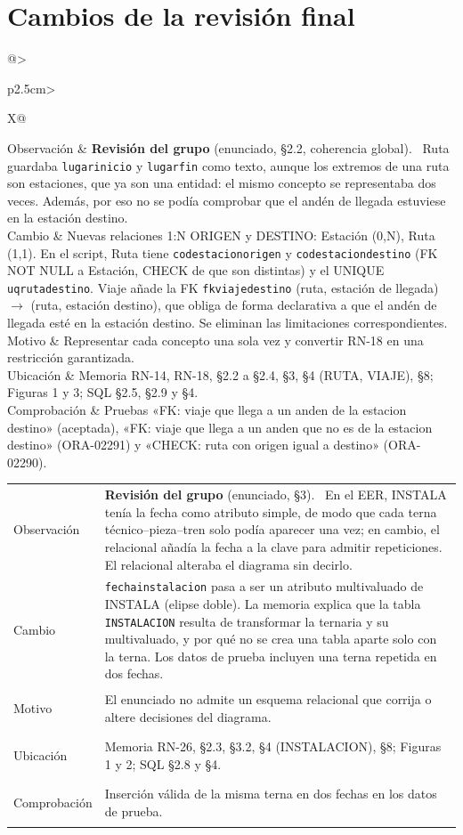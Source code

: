 \documentclass[11pt,a4paper]{article}
\makeatletter
\DeclareRobustCommand{\_}{\textunderscore\allowbreak}
\newcommand{\tb}[1]{\texttt{#1}}
\newcommand{\REV}[1]{\textbf{Revisión del grupo} (enunciado, #1).~}
\newcommand{\cambio}[7]{%
\begin{tcolorbox}[colback=white,colframe=azuluvigo,colbacktitle=azuluvigo!8,coltitle=azuluvigo,
  title={\textbf{#1}\quad #2},fonttitle=\normalsize,boxrule=0.6pt,arc=1mm,
  left=2mm,right=2mm,top=1mm,bottom=1mm,before skip=6pt,after skip=6pt]
\small
\begin{tabularx}{\linewidth}{@{}>{\bfseries\raggedright\arraybackslash}p{2.5cm}>{\raggedright\arraybackslash}X@{}}
Observación & #3\\
Cambio & #4\\
Motivo & #5\\
Ubicación & #6\\
Comprobación & #7\\
\end{tabularx}
\end{tcolorbox}}
\makeatother
\begin{document}
\section{Cambios de la revisión final}
\label{sec:final}
\cambio{F-01}{Origen y destino de la ruta como relaciones con Estación}
{\REV{§2.2, coherencia global} Ruta guardaba \tb{lugar\_inicio} y \tb{lugar\_fin} como texto, aunque los extremos de una ruta son estaciones, que ya son una entidad: el mismo concepto se representaba dos veces. Además, por eso no se podía comprobar que el andén de llegada estuviese en la estación destino.}
{Nuevas relaciones 1:N ORIGEN y DESTINO: Estación (0,N), Ruta (1,1). En el script, Ruta tiene \tb{cod\_estacion\_origen} y \tb{cod\_estacion\_destino} (FK NOT NULL a Estación, CHECK de que son distintas) y el UNIQUE \tb{uq\_ruta\_destino}. Viaje añade la FK \tb{fk\_viaje\_destino} (ruta, estación de llegada) $\rightarrow$ (ruta, estación destino), que obliga de forma declarativa a que el andén de llegada esté en la estación destino. Se eliminan las limitaciones correspondientes.}
{Representar cada concepto una sola vez y convertir RN-18 en una restricción garantizada.}
{Memoria RN-14, RN-18, §2.2 a §2.4, §3, §4 (RUTA, VIAJE), §8; Figuras 1 y 3; SQL §2.5, §2.9 y §4.}
{Pruebas «FK: viaje que llega a un anden de la estacion destino» (aceptada), «FK: viaje que llega a un anden que no es de la estacion destino» (ORA-02291) y «CHECK: ruta con origen igual a destino» (ORA-02290).}

\cambio{F-02}{Fecha de instalación multivaluada}
{\REV{§3} En el EER, INSTALA tenía la fecha como atributo simple, de modo que cada terna técnico–pieza–tren solo podía aparecer una vez; en cambio, el relacional añadía la fecha a la clave para admitir repeticiones. El relacional alteraba el diagrama sin decirlo.}
{\tb{fecha\_instalacion} pasa a ser un atributo multivaluado de INSTALA (elipse doble). La memoria explica que la tabla \tb{INSTALACION} resulta de transformar la ternaria y su multivaluado, y por qué no se crea una tabla aparte solo con la terna. Los datos de prueba incluyen una terna repetida en dos fechas.}
{El enunciado no admite un esquema relacional que corrija o altere decisiones del diagrama.}
{Memoria RN-26, §2.3, §3.2, §4 (INSTALACION), §8; Figuras 1 y 2; SQL §2.8 y §4.}
{Inserción válida de la misma terna en dos fechas en los datos de prueba.}
\end{document}
